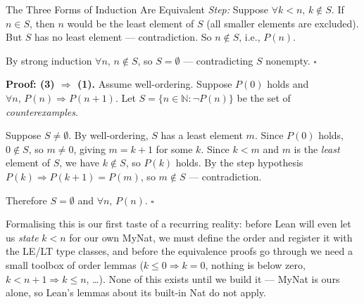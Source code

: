 \documentclass[12pt, openany]{book}
\theoremstyle{plain}
\theoremstyle{definition}
\theoremstyle{remark}
\newcommand{\N}{\mathbb{N}}
\newcommand{\li}[1]{{\ttfamily\small\color{tealaccent}#1}}
\begin{document}
\begin{thmbox}{The Three Forms of Induction Are Equivalent}
\textit{Step:} Suppose $\forall k < n,\, k \notin S$.  If $n \in S$, then $n$ would be the least element of $S$ (all smaller elements are excluded).  But $S$ has no least element --- contradiction.  So $n \notin S$, i.e., $P(n)$.

By strong induction $\forall n,\, n \notin S$, so $S = \emptyset$ --- contradicting $S$ nonempty. \qquad$\square$

\bigskip
\textbf{Proof: (3) $\Rightarrow$ (1).}\quad
Assume well-ordering.  Suppose $P(0)$ holds and $\forall n,\, P(n) \Rightarrow P(n{+}1)$.
Let $S = \{n \in \N : \lnot P(n)\}$ be the set of \emph{counterexamples}.

Suppose $S \neq \emptyset$.  By well-ordering, $S$ has a least element $m$.
Since $P(0)$ holds, $0 \notin S$, so $m \neq 0$, giving $m = k{+}1$ for some $k$.
Since $k < m$ and $m$ is the \emph{least} element of $S$, we have $k \notin S$, so $P(k)$ holds.
By the step hypothesis $P(k) \Rightarrow P(k{+}1) = P(m)$, so $m \notin S$ --- contradiction.

Therefore $S = \emptyset$ and $\forall n,\, P(n)$. \qquad$\square$
\end{thmbox}
\color{black}

Formalising this is our first taste of a recurring reality: before Lean will even let us \emph{state} $k < n$ for our own \li{MyNat}, we must define the order and register it with the \li{LE}/\li{LT} type classes, and before the equivalence proofs go through we need a small toolbox of order lemmas ($k \leq 0 \Rightarrow k = 0$, nothing is below zero, $k < n{+}1 \Rightarrow k \leq n$, \ldots).  None of this exists until we build it --- \li{MyNat} is ours alone, so Lean's lemmas about its built-in \li{Nat} do not apply.
\end{document}
